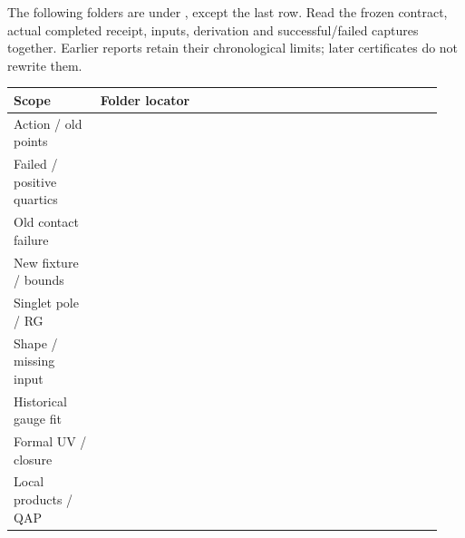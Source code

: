 \documentclass[10pt,letterpaper]{article}
\newcommand{\pathref}[1]{\texttt{\detokenize{#1}}}
\begin{document}
The following folders are under \pathref{calculations/}, except the last row.
Read the frozen contract, actual completed receipt, inputs, derivation and
successful/failed captures together. Earlier reports retain their chronological
limits; later certificates do not rewrite them.

{\small
\begin{tabular}{p{0.19\linewidth}p{0.75\linewidth}}
\toprule Scope & Folder locator\\
\midrule
Action / old points & \pathref{canonical_so10_scalar_reconstruction/}\newline
\pathref{canonical_so10_scalar_benchmark/}\\[3pt]
Failed / positive quartics & \pathref{canonical_so10_light_higgs_quartic/}\newline
\pathref{canonical_so10_positive_higgs/}\\[3pt]
Old contact failure & \pathref{canonical_so10_radial_input_control/}\\[3pt]
New fixture / bounds & \pathref{canonical_so10_coherent_joint_witness/}\newline
\pathref{canonical_so10_complete_contact_bound/}\newline
\pathref{canonical_so10_finite_full_bfb/}\\[3pt]
Singlet pole / RG & \pathref{canonical_so10_singlet_pole_control/}\newline
\pathref{canonical_so10_singlet_pole_rg_check/}\\[3pt]
Shape / missing input & \pathref{canonical_so10_singlet_momentum_shape/}\newline
\pathref{canonical_so10_singlet_two_loop_input_closure/}\newline
\pathref{canonical_so10_scalar_gauge_homothety/}\\[3pt]
Historical gauge fit & \pathref{canonical_so10_direct_gauge_next_order/}\\[3pt]
Formal UV / closure & \pathref{canonical_so10_bv_uv_residue_bridge/}\newline
\pathref{canonical_so10_physical_counterterm_span/}\newline
\pathref{canonical_so10_one_loop_acceptance_reconciliation/}\\[3pt]
Local products / QAP & \pathref{canonical_so10_graded_causal_qap/}\newline
\pathref{canonical_so10_background_reference_normalization/}\newline
\pathref{canonical_so10_local_cutoff_comparison/}\\[3pt]

\end{tabular}}
\end{document}
